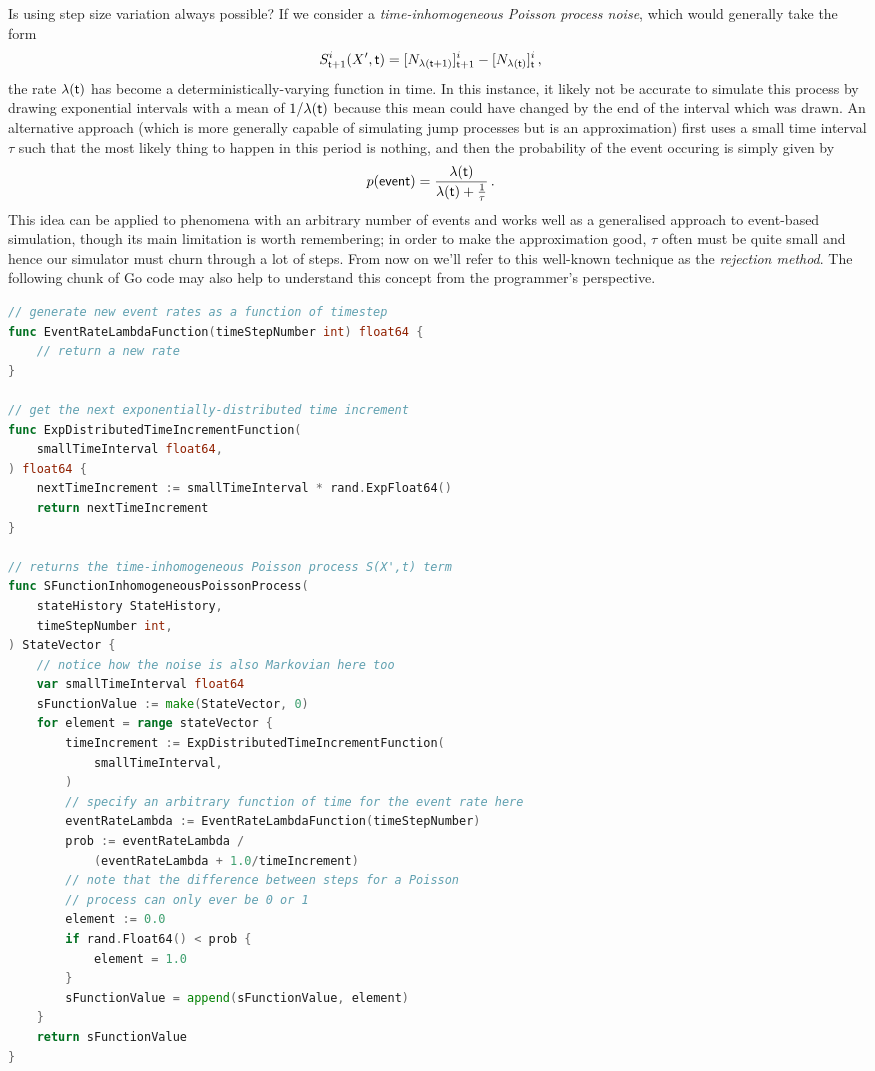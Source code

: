 \documentclass{book}
\begin{document}
Is using step size variation always possible? If we consider a \emph{time-inhomogeneous Poisson process noise}, which would generally take the form
\begin{align}
S^{i}_{{\sf t}+1}(X',{\sf t}) &= [N_{\lambda ({\sf t}+1)}]^i_{{\sf t}+1}-[N_{\lambda ({\sf t})}]^i_{\sf t}\,,
\end{align}
the rate $\lambda ({\sf t})$ has become a deterministically-varying function in time. In this instance, it likely not be accurate to simulate this process by drawing exponential intervals with a mean of $1/\lambda ({\sf t})$ because this mean could have changed by the end of the interval which was drawn. An alternative approach (which is more generally capable of simulating jump processes but is an approximation) first uses a small time interval $\tau$ such that the most likely thing to happen in this period is nothing, and then the probability of the event occuring is simply given by
\begin{align}
p({\sf event}) &= \frac{\lambda ({\sf t})}{\lambda ({\sf t}) + \frac{1}{\tau}} \label{eq:rejection}\,.
\end{align}
This idea can be applied to phenomena with an arbitrary number of events and works well as a generalised approach to event-based simulation, though its main limitation is worth remembering; in order to make the approximation good, $\tau$ often must be quite small and hence our simulator must churn through a lot of steps. From now on we'll refer to this well-known technique as the \emph{rejection method}. The following chunk of Go code may also help to understand this concept from the programmer's perspective.

\begin{lstlisting}[language=Go]
// generate new event rates as a function of timestep
func EventRateLambdaFunction(timeStepNumber int) float64 {
    // return a new rate
}

// get the next exponentially-distributed time increment
func ExpDistributedTimeIncrementFunction(
    smallTimeInterval float64,
) float64 {
    nextTimeIncrement := smallTimeInterval * rand.ExpFloat64()
    return nextTimeIncrement
}

// returns the time-inhomogeneous Poisson process S(X',t) term 
func SFunctionInhomogeneousPoissonProcess(
    stateHistory StateHistory,
    timeStepNumber int,
) StateVector {
    // notice how the noise is also Markovian here too
    var smallTimeInterval float64
    sFunctionValue := make(StateVector, 0)
    for element = range stateVector {
        timeIncrement := ExpDistributedTimeIncrementFunction(
            smallTimeInterval,
        )
        // specify an arbitrary function of time for the event rate here
        eventRateLambda := EventRateLambdaFunction(timeStepNumber)
        prob := eventRateLambda /
            (eventRateLambda + 1.0/timeIncrement)
        // note that the difference between steps for a Poisson
        // process can only ever be 0 or 1
        element := 0.0
        if rand.Float64() < prob {
            element = 1.0
        }
        sFunctionValue = append(sFunctionValue, element)
    }
    return sFunctionValue
}
\end{lstlisting}
\end{document}

